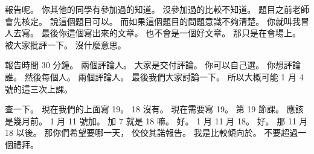 \hypertarget{w01:cue:1472}{}報告呢。
\hypertarget{w01:cue:1473}{}你其他的同學有參加過的知道。
\hypertarget{w01:cue:1474}{}沒參加過的比較不知道。
\hypertarget{w01:cue:1475}{}題目之前老師會先核定。
\hypertarget{w01:cue:1476}{}說這個題目可以。
\hypertarget{w01:cue:1477}{}而如果這個題目的問題意識不夠清楚。
\hypertarget{w01:cue:1478}{}你就叫我冒人去寫。
\hypertarget{w01:cue:1479}{}最後你這個寫出來的文章。
\hypertarget{w01:cue:1480}{}也不會是一個好文章。
\hypertarget{w01:cue:1481}{}那只是在會場上。
\hypertarget{w01:cue:1482}{}被大家批評一下。
\hypertarget{w01:cue:1483}{}沒什麼意思。

\hypertarget{w01:cue:1484}{}報告時間 30 分鐘。
\hypertarget{w01:cue:1485}{}兩個評論人。
\hypertarget{w01:cue:1486}{}大家是交付評論。
\hypertarget{w01:cue:1487}{}你可以自己選。
\hypertarget{w01:cue:1488}{}你想評論誰。
\hypertarget{w01:cue:1489}{}然後每個人。
\hypertarget{w01:cue:1490}{}兩個評論人。
\hypertarget{w01:cue:1491}{}最後我們大家討論一下。
\hypertarget{w01:cue:1492}{}所以大概可能 1 月 4 號的這三次上課。

\hypertarget{w01:cue:1493}{}查一下。
\hypertarget{w01:cue:1494}{}現在我們的上面寫 19。
\hypertarget{w01:cue:1495}{}18 沒有。
\hypertarget{w01:cue:1496}{}現在需要寫 19。
\hypertarget{w01:cue:1497}{}第 19 節課。
\hypertarget{w01:cue:1498}{}應該是幾月前。
\hypertarget{w01:cue:1499}{}1 月 11 號加。
\hypertarget{w01:cue:1500}{}加 7 就是 18 嘛。
\hypertarget{w01:cue:1501}{}好。
\hypertarget{w01:cue:1502}{}1 月 11 月 18。
\hypertarget{w01:cue:1503}{}好。
\hypertarget{w01:cue:1504}{}那 11 月 18 以後。
\hypertarget{w01:cue:1505}{}那你們希望要哪一天，
\hypertarget{w01:cue:1506}{}佼佼其諾報告。
\hypertarget{w01:cue:1507}{}我是比較傾向於。
\hypertarget{w01:cue:1508}{}不要超過一個禮拜。

